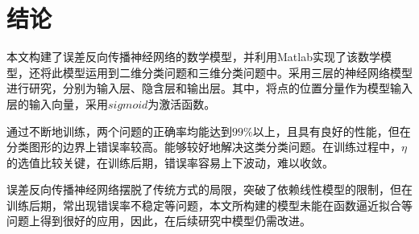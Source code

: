 \chapter{结论}

本文构建了误差反向传播神经网络的数学模型，并利用Matlab实现了该数学模型，还将此模型运用到二维分类问题和三维分类问题中。采用三层的神经网络模型进行研究，分别为输入层、隐含层和输出层。其中，将点的位置分量作为模型输入层的输入向量，采用$sigmoid$为激活函数。

通过不断地训练，两个问题的正确率均能达到$99\%$以上，且具有良好的性能，但在分类图形的边界上错误率较高。能够较好地解决这类分类问题。在训练过程中，$\eta$的选值比较关键，在训练后期，错误率容易上下波动，难以收敛。

误差反向传播神经网络摆脱了传统方式的局限，突破了依赖线性模型的限制，但在训练后期，常出现错误率不稳定等问题，本文所构建的模型未能在函数逼近拟合等问题上得到很好的应用，因此，在后续研究中模型仍需改进。

